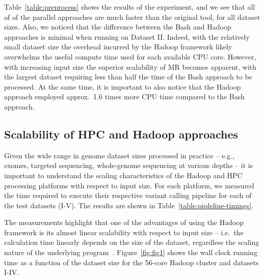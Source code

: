 \documentclass[10pt]{article}
\newcommand{\COMMENT}[1]{{\color{red} #1 }}
\newcommand{\COM}[1]{{\color{blue} #1 }}
\begin{document}

Table~\ref{table:preprocess} shows the results of the experiment, and we see that all 
of of the parallel approaches are much faster than the original tool, for
all dataset sizes.  Also, we noticed that the difference between the Bash and Hadoop
approaches is minimal when running on Dataset II\@.  Indeed, with the relatively
small dataset size the overhead incurred by the Hadoop framework likely
overwhelms the useful compute time used for each available CPU core. However,
with increasing input size the superior scalability of MR becomes apparent, with
the largest dataset requiring less than half the time of the Bash
approach to be processed. At the same time, it is important to also notice that
the Hadoop approach employed approx.\ 1.6 times more CPU time compared to the
Bash approach.


\subsection*{Scalability of HPC and Hadoop approaches}
Given the wide range in genome dataset sizes processed in practice -- e.g.,
exomes, targeted sequencing, whole-genome sequencing at various depths -- it is
important to understand the scaling characteristics of the Hadoop and HPC processing
platforms with respect to input size. For each platform, we
measured the time required to execute their respective variant calling
pipeline for each of the test datasets (I-V). The results are
shown in Table~\ref{table:pipleline-timings}.

The measurements highlight that one of the advantages of using the Hadoop framework is
its almost linear scalability with respect to input size -- i.e.\ the
calculation time linearly depends on the size of the
dataset, regardless the scaling nature of the underlying program~\cite{Langmead:2009kx,Pireddu:2011vn}.
Figure~\ref{fig:fig1} shows the wall clock
running time as a function of the dataset size for the 56-core Hadoop cluster and datasets
I-IV.
\end{document}

